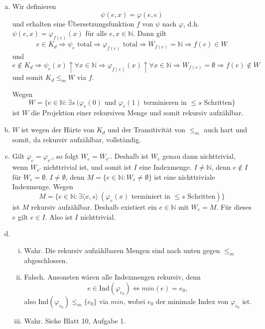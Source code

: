\documentclass[german,headsepline]{scrartcl}
\begin{document}
	\begin{solution}
		\begin{enumerate}[(a)]
			\item Wir definieren
				\[\psi(e,x)=\varphi(e,e)\]
				und erhalten eine Übersetzungsfunktion $f$ von $\psi$ nach $\varphi$,
				d.h. $\psi(e,x)=\varphi_{f(e)}(x)$ für alle $e,x\in\mathbb{N}$.
				Dann gilt
				\[e\in K_d\Rightarrow\psi_e\text{ total}\Rightarrow\varphi_{f(e)}\text{ total}
				\Rightarrow W_{f(e)}=\mathbb{N}\Rightarrow f(e)\in W\]
				und
				\[e\notin K_d\Rightarrow\psi_e(x)\uparrow\forall x\in\mathbb{N}
				\Rightarrow\varphi_{f(e)}(x)\uparrow\forall x\in\mathbb{N}
				\Rightarrow W_{f(e)}=\emptyset\Rightarrow f(e)\notin W\]
				und somit $K_d\leq_mW$ via $f$.
				
				Wegen
				\[W=\{e\in\mathbb{N}\colon\exists s~(\varphi_e(0)\text{ und }\varphi_e(1)\text{ terminieren in $\leq s$ Schritten}\}\]
				ist $W$ die Projektion einer rekursiven Menge und somit rekursiv aufzählbar.
			\item $W$ ist wegen der Härte von $K_d$ und der Transitivität von $\leq_m$ auch hart und somit, da rekursiv aufzählbar, vollständig.
			\item Gilt $\varphi_e=\varphi_{e'}$, so folgt $W_e=W_{e'}$.
				Deshalb ist $W_e$ genau dann nichttrivial, wenn $W_{e'}$ nichttrivial ist, und somit ist $I$ eine Indexmenge.
				$I\neq\mathbb{N}$, denn $e\notin I$ für $W_e=\emptyset$.
				$I\neq\emptyset$, denn $M=\{e\in\mathbb{N}\colon W_e\neq\emptyset\}$ ist eine nichttriviale Indexmenge. Wegen
				\[M=\{e\in\mathbb{N}\colon\exists\langle x,s\rangle~(\varphi_e(x)\text{ terminiert in }\leq s\text{ Schritten})\}\]
				ist $M$ rekursiv aufzählbar.
				Deshalb existiert ein $e\in\mathbb{N}$ mit $W_e=M$. Für dieses $e$ gilt $e\in I$.
				Also ist $I$ nichttrivial.
			\item \begin{enumerate}[(i)]
					\item Wahr. Die rekursiv aufzählbaren Mengen sind nach unten gegen $\leq_m$ abgeschlossen.
					\item Falsch. Ansonsten wären alle Indexmengen rekursiv, denn
						\[e\in\text{Ind}(\varphi_{e_0})\Leftrightarrow min(e)=e_0,\]
						also $\text{Ind}(\varphi_{e_0})\leq_m\{e_0\}$ via $min$,
						wobei $e_0$ der minimale Index von $\varphi_{e_0}$ ist.
					\item Wahr. Siehe Blatt 10, Aufgabe 1.
				\end{enumerate}
				
		\end{enumerate}
	\end{solution}
	
\end{document}
